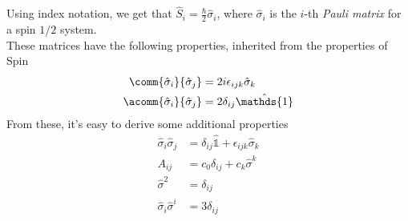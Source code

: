 \documentclass[a4paper, 11pt]{book}
\newcommand{\1}{\opr{\mathds{1}}}
\newcommand{\opr}[1]{\hat{#1}}
\newcommand{\lc}[1]{\epsilon_{#1}}
\newcommand{\kd}[1]{\delta_{#1}}
\theoremstyle{plain}
\begin{document}
	Using index notation, we get that $\opr{S}_i=\frac{\hbar}{2}\opr{\sigma}_i$, where $\opr{\sigma}_i$ is the $i$-th \textit{Pauli matrix} for a spin $1/2$ system.\\
	These matrices have the following properties, inherited from the properties of Spin
	\begin{equation}
		\begin{aligned}
			\comm{\opr{\sigma}_i}{\opr{\sigma}_j}&=2i\lc{ijk}\opr{\sigma}_k\\
			\acomm{\opr{\sigma}_i}{\opr{\sigma}_j}&=2\kd{ij}\1
		\end{aligned}
		\label{eq:pauliprop}
	\end{equation}
	From these, it's easy to derive some additional properties
	\begin{equation*}
		\begin{aligned}
			\opr{\sigma}_i\opr{\sigma}_j&=\kd{ij}\1+\lc{ijk}\opr{\sigma}_k\\
			A_{ij}&=c_0\kd{ij}+c_k\opr{\sigma}^k\\
			\opr{\sigma}^2&=\kd{ij}\\
			\opr{\sigma}_i\opr{\sigma}^i&=3\kd{ij}
		\end{aligned}
	\end{equation*}
\end{document}
